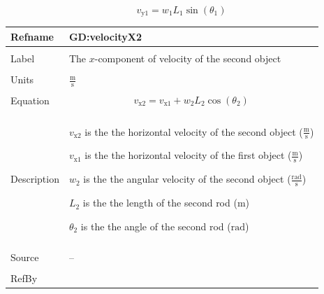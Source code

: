\documentclass[12pt]{article}
\begin{document}
\begin{displaymath}
{v_{\text{y}1}}={w_{1}} {L_{1}} \sin\left({θ_{1}}\right)
\end{displaymath}
\vspace{\baselineskip}
\noindent
\begin{minipage}{\textwidth}
\begin{tabular}{>{\raggedright}p{}>{\raggedright\arraybackslash}p{}}
\toprule \textbf{Refname} & \textbf{GD:velocityX2}
\label{GD:velocityX2}
\\ \midrule \\
Label & The $x$-component of velocity of the second object
        
\\ \midrule \\
Units & $\frac{\text{m}}{\text{s}}$
        
\\ \midrule \\
Equation & \begin{displaymath}
           {v_{\text{x}2}}={v_{\text{x}1}}+{w_{2}} {L_{2}} \cos\left({θ_{2}}\right)
           \end{displaymath}
\\ \midrule \\
Description & \begin{symbDescription}
              \item{${v_{\text{x}2}}$ is the the horizontal velocity of the second object ($\frac{\text{m}}{\text{s}}$)}
              \item{${v_{\text{x}1}}$ is the the horizontal velocity of the first object ($\frac{\text{m}}{\text{s}}$)}
              \item{${w_{2}}$ is the the angular velocity of the second object ($\frac{\text{rad}}{\text{s}}$)}
              \item{${L_{2}}$ is the the length of the second rod (${\text{m}}$)}
              \item{${θ_{2}}$ is the the angle of the second rod (${\text{rad}}$)}
              \end{symbDescription}
\\ \midrule \\
Source & --
         
\\ \midrule \\
RefBy & 
\\ \bottomrule
\end{tabular}
\end{minipage}
\end{document}
